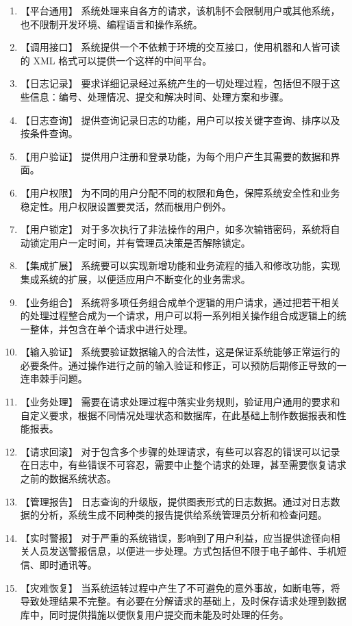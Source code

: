 \documentclass[cs4size,a4paper,nofonts]{ctexart}
\begin{document}
\begin{enumerate}
\item 【平台通用】
系统处理来自各方的请求，该机制不会限制用户或其他系统，也不限制开发环境、编程语言和操作系统。
\item 【调用接口】
系统提供一个不依赖于环境的交互接口，使用机器和人皆可读的 XML 格式可以提供一个这样的中间平台。
\item 【日志记录】
要求详细记录经过系统产生的一切处理过程，包括但不限于这些信息：编号、处理情况、提交和解决时间、处理方案和步骤。
\item 【日志查询】
提供查询记录日志的功能，用户可以按关键字查询、排序以及按条件查询。
\item 【用户验证】
提供用户注册和登录功能，为每个用户产生其需要的数据和界面。
\item 【用户权限】
为不同的用户分配不同的权限和角色，保障系统安全性和业务稳定性。用户权限设置要灵活，然而根用户例外。
\item 【用户锁定】
对于多次执行了非法操作的用户，如多次输错密码，系统将自动锁定用户一定时间，并有管理员决策是否解除锁定。
\item 【集成扩展】
系统要可以实现新增功能和业务流程的插入和修改功能，实现集成系统的扩展，以便适应用户不断变化的业务需求。
\item 【业务组合】
系统将多项任务组合成单个逻辑的用户请求，通过把若干相关的处理过程整合成为一个请求，用户可以将一系列相关操作组合成逻辑上的统一整体，并包含在单个请求中进行处理。
\item 【输入验证】
系统要验证数据输入的合法性，这是保证系统能够正常运行的必要条件。通过操作进行之前的输入验证和修正，可以预防后期修正导致的一连串棘手问题。
\item 【业务处理】
需要在请求处理过程中落实业务规则，验证用户通用的要求和自定义要求，根据不同情况处理状态和数据库，在此基础上制作数据报表和性能报表。
\item 【请求回滚】
对于包含多个步骤的处理请求，有些可以容忍的错误可以记录在日志中，有些错误不可容忍，需要中止整个请求的处理，甚至需要恢复请求之前的数据系统状态。
\item 【管理报告】
日志查询的升级版，提供图表形式的日志数据。通过对日志数据的分析，系统生成不同种类的报告提供给系统管理员分析和检查问题。
\item 【实时警报】
对于严重的系统错误，影响到了用户利益，应当提供途径向相关人员发送警报信息，以便进一步处理。方式包括但不限于电子邮件、手机短信、即时通讯等。
\item 【灾难恢复】
当系统运转过程中产生了不可避免的意外事故，如断电等，将导致处理结果不完整。有必要在分解请求的基础上，及时保存请求处理到数据库中，同时提供措施以便恢复用户提交而未能及时处理的任务。

\end{enumerate}
\end{document}
